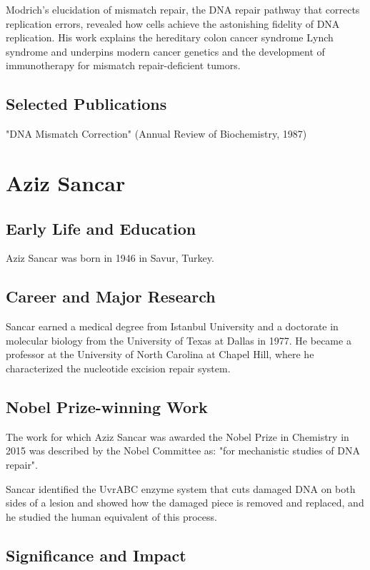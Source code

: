 Modrich's elucidation of mismatch repair, the DNA repair pathway that corrects replication errors, revealed how cells achieve the astonishing fidelity of DNA replication. His work explains the hereditary colon cancer syndrome Lynch syndrome and underpins modern cancer genetics and the development of immunotherapy for mismatch repair-deficient tumors.

\subsection*{Selected Publications}

"DNA Mismatch Correction" (Annual Review of Biochemistry, 1987)

\clearpage

\section{Aziz Sancar}

\subsection*{Early Life and Education}

Aziz Sancar was born in 1946 in Savur, Turkey.

\subsection*{Career and Major Research}

Sancar earned a medical degree from Istanbul University and a doctorate in molecular biology from the University of Texas at Dallas in 1977. He became a professor at the University of North Carolina at Chapel Hill, where he characterized the nucleotide excision repair system.

\subsection*{Nobel Prize-winning Work}

The work for which Aziz Sancar was awarded the Nobel Prize in Chemistry in 2015 was described by the Nobel Committee as: "for mechanistic studies of DNA repair".

Sancar identified the UvrABC enzyme system that cuts damaged DNA on both sides of a lesion and showed how the damaged piece is removed and replaced, and he studied the human equivalent of this process.

\subsection*{Significance and Impact}

